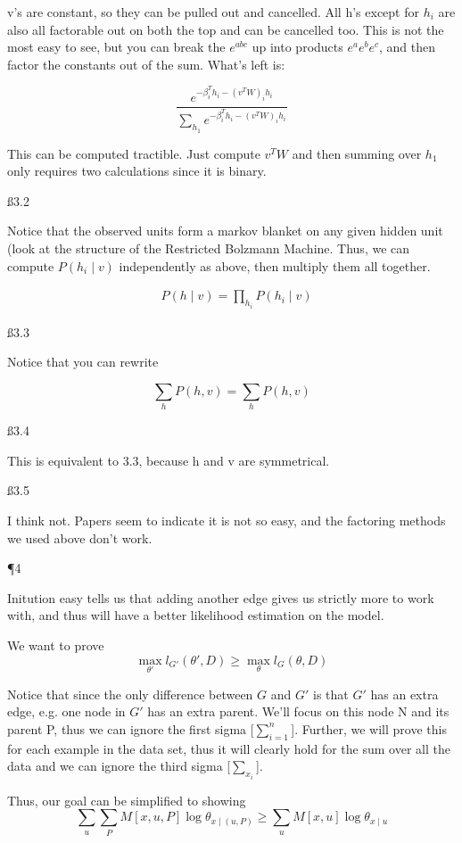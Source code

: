 v's are constant, so they can be pulled out and cancelled. All h's except for $h_i$ are also all factorable out on both the top and can be cancelled too. This is not the most easy to see, but you can break the $e^{abc}$ up into products $e^ae^be^c$, and then factor the constants out of the sum. What's left is:

\[
\frac { e^{-\beta^T_ih_i-(v^TW)_ih_i}}{\sum_{h_1} e^{-\beta^T_ih_i-(v^TW)_ih_i}}
\]

This can be computed tractible. Just compute $v^TW$ and then summing over $h_1$ only requires two calculations since it is binary.

\ss{3.2}

Notice that the observed units form a markov blanket on any given hidden unit (look at the structure of the Restricted Bolzmann Machine. Thus, we can compute $ P (h_i \mid v) $ independently as above, then multiply them all together.

\begin{align*}
& P(h \mid v) = \prod_{h_i} P(h_i \mid v)
\end{align*}

\ss{3.3}

Notice that you can rewrite

\[
\sum_h P(h,v) = \sum_h P(h,v)
\]

\ss{3.4}

This is equivalent to 3.3, because h and v are symmetrical.

\ss{3.5}

I think not. Papers seem to indicate it is not so easy, and the factoring methods we used above don't work.


\P 4

Initution easy tells us that adding another edge gives us strictly more to work with, and thus will have a better likelihood estimation on the model.

We want to prove 
\[
\max_{\theta'} l_{G'} (\theta', D) \ge \max_{\theta} l_{G} (\theta, D)
\]

Notice that since the only difference between $G$ and $G'$ is that $G'$ has an extra edge, e.g. one node in $G'$ has an extra parent. We'll focus on this node N and its parent P, thus we can ignore the first sigma [$\sum_{i=1}^n$]. Further, we will prove this for each example in the data set, thus it will clearly hold for the sum over all the data and we can ignore the third sigma [$\sum_{x_i}$].

Thus, our goal can be simplified to showing
\[
\sum_{u} \sum_{P} M[x,u,P] \log \theta_{x \mid (u,P)} \ge \sum_{u} M[x,u] \log \theta_{x \mid u} 
\]

